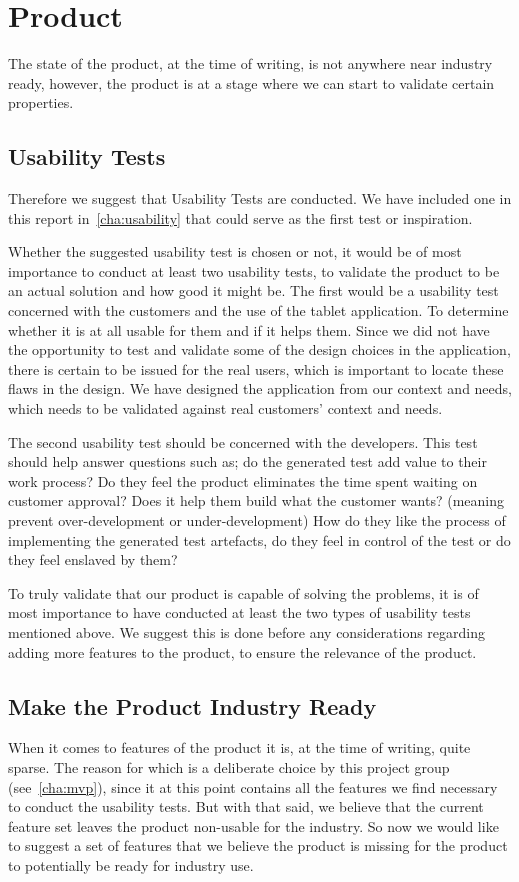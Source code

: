 \section{Product}
The state of the product, at the time of writing, is not anywhere near industry ready, however, the product is at a stage where we can start to validate certain properties.

\subsection{Usability Tests}
Therefore we suggest that Usability Tests are conducted.
We have included one in this report in~\autoref{cha:usability} that could serve as the first test or inspiration.

Whether the suggested usability test is chosen or not, it would be of most importance to conduct at least two usability tests, to validate the product to be an actual solution and how good it might be.
The first would be a usability test concerned with the customers and the use of the tablet application.
To determine whether it is at all usable for them and if it helps them.
Since we did not have the opportunity to test and validate some of the design choices in the application, there is certain to be issued for the real users, which is important to locate these flaws in the design.
We have designed the application from our context and needs, which needs to be validated against real customers' context and needs.

The second usability test should be concerned with the developers.
This test should help answer questions such as; do the generated test add value to their work process? 
Do they feel the product eliminates the time spent waiting on customer approval?
Does it help them build what the customer wants? (meaning prevent over-development or under-development)
How do they like the process of implementing the generated test artefacts, do they feel in control of the test or do they feel enslaved by them?

To truly validate that our product is capable of solving the problems, it is of most importance to have conducted at least the two types of usability tests mentioned above.
We suggest this is done before any considerations regarding adding more features to the product, to ensure the relevance of the product.

\subsection{Make the Product Industry Ready}
When it comes to features of the product it is, at the time of writing, quite sparse.
The reason for which is a deliberate choice by this project group (see~\autoref{cha:mvp}), since it at this point contains all the features we find necessary to conduct the usability tests.
But with that said, we believe that the current feature set leaves the product non-usable for the industry.
So now we would like to suggest a set of features that we believe the product is missing for the product to potentially be ready for industry use.

